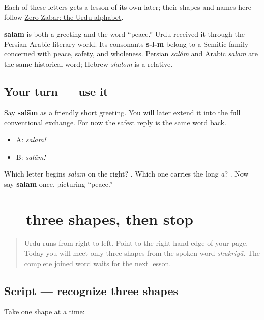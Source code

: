 Each of these letters gets a lesson of its own later; their shapes and names here follow \href{https://openbooks.library.northwestern.edu/zerozabar/chapter/the-urdu-alphabet/}{Zero Zabar: the Urdu alphabet}.

\begin{cousinweb}
\textbf{salām} is both a greeting and the word “peace.” Urdu received it through the Persian-Arabic literary world. Its consonants \textbf{s-l-m} belong to a Semitic family concerned with peace, safety, and wholeness. Persian \emph{salâm} and Arabic \emph{salām} are the same historical word; Hebrew \emph{shalom} is a relative.
\end{cousinweb}

\subsection*{Your turn — use it}
Say \textbf{salām} as a friendly short greeting. You will later extend it into the full conventional exchange. For now the safest reply is the same word back.

\begin{itemize}
\raggedright
  \item A: \emph{salām!}
  \item B: \emph{salām!}
\end{itemize}

\begin{tcolorbox}[breakable,colback=teal!4,colframe=teal!35!black,title={Before you move on}]
Which letter begins \emph{salām} on the right? \textbf{}. Which one carries the long \emph{ā}? \textbf{}. Now say \textbf{salām} once, picturing “peace.”
\end{tcolorbox}
\section[\texorpdfstring{\ur{ش} \ur{ک} \ur{ر} (shīn, kāf, re)}{ش ک ر (shīn, kāf, re)}]{   — three shapes, then stop}

\label{lesson:UR-W01-shukriya-first-three}



\begin{quote}
Urdu runs from right to left. Point to the right-hand edge of your page. Today you will meet only three shapes from the spoken word \emph{shukriyā}. The complete joined word waits for the next lesson.
\end{quote}

\subsection*{Script — recognize three shapes}
Take one shape at a time:

